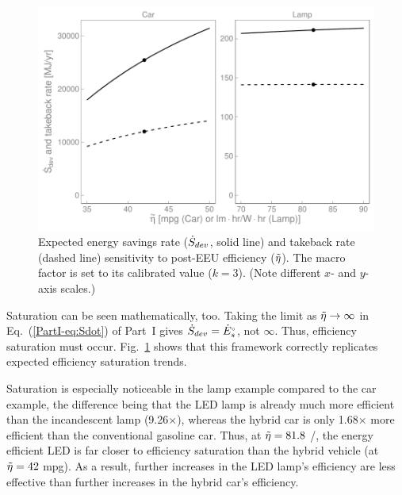 \documentclass[12pt]{article}\usepackage[]{graphicx}\usepackage[]{xcolor}
\makeatletter
\def\maxwidth{ %
  \ifdim\Gin@nat@width>\linewidth
    \linewidth
  \else
    \Gin@nat@width
  \fi
}
\newenvironment{knitrout}{}{} %
\makeatother
\begin{document}
\begin{knitrout}
\color{fgcolor}\begin{figure}

{\centering \includegraphics[width=\maxwidth]{figure/eta_tilde_takeback_Sdot_sens_graph-1} 

}

\caption[Expected energy savings rate ($\Sdot$, solid line) and takeback rate (dashed line) sensitivity to post-EEU efficiency ($\amacro{\eta}$)]{Expected energy savings rate ($\Sdot$, solid line) and takeback rate (dashed line) sensitivity to post-EEU efficiency ($\amacro{\eta}$). The macro factor is set to its calibrated value ($k = 3$). (Note different $x$- and $y$-axis scales.)}\label{fig:eta_tilde_takeback_Sdot_sens_graph}
\end{figure}

\end{knitrout}
  
  
Saturation can be seen mathematically, too.
Taking the limit as $\tilde{\eta} \rightarrow \infty$ 
in Eq.~(\ref{PartI-eq:Sdot}) of Part~I gives $\dot{S}_{dev} = {}{\dot{E}}^{\scriptscriptstyle \circ}_s$, 
not $\infty$. 
Thus, efficiency saturation must occur.
Fig.~\ref{fig:eta_tilde_takeback_Sdot_sens_graph}
shows that this framework correctly replicates
expected efficiency saturation trends.

Saturation is especially noticeable in the lamp example
compared to the car example,
the difference being that 
the LED lamp is already much more efficient than the incandescent lamp
(9.26$\times$),
whereas the hybrid car is only 
1.68$\times$ more efficient than the conventional gasoline car. 
Thus, at $\tilde{\eta} = 81.8$ \lmhr/\Whr, 
the energy efficient LED
is far closer to efficiency saturation than the hybrid vehicle 
(at $\tilde{\eta} = 42$ mpg).
As a result, further increases in the LED lamp's efficiency 
are less effective than further increases in the hybrid car's efficiency.
\end{document}
